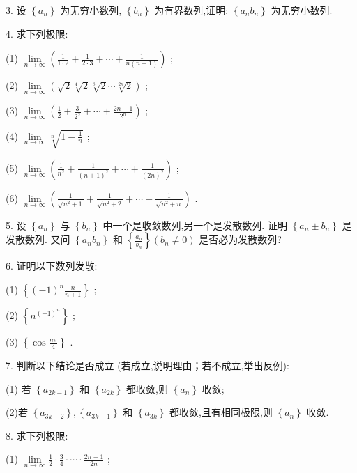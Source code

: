 3. 设 \(\left\{  {a}_{n}\right\}\) 为无穷小数列, \(\left\{  {b}_{n}\right\}\) 为有界数列,证明: \(\left\{  {{a}_{n}{b}_{n}}\right\}\) 为无穷小数列.

4. 求下列极限:

(1) \(\mathop{\lim }\limits_{{n \rightarrow  \infty }}\left( {\frac{1}{1 \cdot  2} + \frac{1}{2 \cdot  3} + \cdots  + \frac{1}{n\left( {n + 1}\right) }}\right)\) ;

(2) \(\mathop{\lim }\limits_{{n \rightarrow  \infty }}\left( {\sqrt{2}\sqrt[4]{2}\sqrt[8]{2}\cdots \sqrt[{2n}]{2}}\right)\) ;

(3) \(\mathop{\lim }\limits_{{n \rightarrow  \infty }}\left( {\frac{1}{2} + \frac{3}{{2}^{2}} + \cdots  + \frac{{2n} - 1}{{2}^{n}}}\right)\) ;

(4) \(\mathop{\lim }\limits_{{n \rightarrow  \infty }}\sqrt[n]{1 - \frac{1}{n}}\) ;

(5) \(\mathop{\lim }\limits_{{n \rightarrow  \infty }}\left( {\frac{1}{{n}^{2}} + \frac{1}{{\left( n + 1\right) }^{2}} + \cdots  + \frac{1}{{\left( 2n\right) }^{2}}}\right)\) ;

(6) \(\mathop{\lim }\limits_{{n \rightarrow  \infty }}\left( {\frac{1}{\sqrt{{n}^{2} + 1}} + \frac{1}{\sqrt{{n}^{2} + 2}} + \cdots  + \frac{1}{\sqrt{{n}^{2} + n}}}\right)\) .

5. 设 \(\left\{  {a}_{n}\right\}\) 与 \(\left\{  {b}_{n}\right\}\) 中一个是收敛数列,另一个是发散数列. 证明 \(\left\{  {{a}_{n} \pm  {b}_{n}}\right\}\) 是发散数列. 又问 \(\left\{  {{a}_{n}{b}_{n}}\right\}\) 和 \(\left\{  \frac{{a}_{n}}{{b}_{n}}\right\}  \left( {{b}_{n} \neq  0}\right)\) 是否必为发散数列?

6. 证明以下数列发散:

(1) \(\left\{  {{\left( -1\right) }^{n}\frac{n}{n + 1}}\right\}\) ;

(2) \(\left\{  {n}^{{\left( -1\right) }^{n}}\right\}\) ;

(3) \(\left\{  {\cos \frac{n\pi }{4}}\right\}\) .

7. 判断以下结论是否成立 (若成立,说明理由；若不成立,举出反例):

(1) 若 \(\left\{  {a}_{{2k} - 1}\right\}\) 和 \(\left\{  {a}_{2k}\right\}\) 都收敛,则 \(\left\{  {a}_{n}\right\}\) 收敛;

(2)若 \(\left\{  {a}_{{3k} - 2}\right\}  ,\left\{  {a}_{{3k} - 1}\right\}\) 和 \(\left\{  {a}_{3k}\right\}\) 都收敛,且有相同极限,则 \(\left\{  {a}_{n}\right\}\) 收敛.

8. 求下列极限:

(1) \(\mathop{\lim }\limits_{{n \rightarrow  \infty }}\frac{1}{2} \cdot  \frac{3}{4} \cdot  \cdots  \cdot  \frac{{2n} - 1}{2n}\) ;

